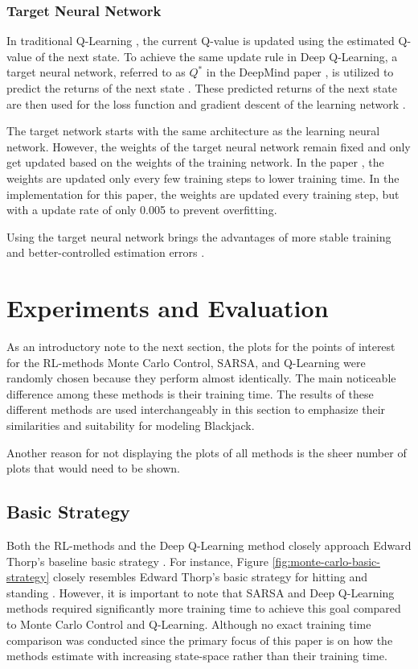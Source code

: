 \documentclass[conference]{IEEEtran}
\begin{document}
\subsubsection{Target Neural Network}
In traditional Q-Learning \cite{b4}, the current Q-value is updated using the estimated Q-value of the next state. To achieve the same update rule in Deep Q-Learning, a target neural network, referred to as $Q^*$ in the DeepMind paper \cite{b2}, is utilized to predict the returns of the next state \cite{b6}. These predicted returns of the next state are then used for the loss function and gradient descent of the learning network \cite{b6}.

The target network starts with the same architecture as the learning neural network. However, the weights of the target neural network remain fixed and only get updated based on the weights of the training network. In the paper \cite{b6}, the weights are updated only every few training steps to lower training time. In the implementation for this paper, the weights are updated every training step, but with a update rate of only 0.005 to prevent overfitting.

Using the target neural network brings the advantages of more stable training and better-controlled estimation errors \cite{b6}.


\section{Experiments and Evaluation}
As an introductory note to the next section, the plots for the points of interest for the RL-methods Monte Carlo Control, SARSA, and Q-Learning were randomly chosen because they perform almost identically. The main noticeable difference among these methods is their training time. The results of these different methods are used interchangeably in this section to emphasize their similarities and suitability for modeling Blackjack.

Another reason for not displaying the plots of all methods is the sheer number of plots that would need to be shown.


\subsection{Basic Strategy}
Both the RL-methods and the Deep Q-Learning method closely approach Edward Thorp's baseline basic strategy \cite{b1}. For instance, Figure \ref{fig:monte-carlo-basic-strategy} closely resembles Edward Thorp's basic strategy for hitting and standing \cite{b1}. However, it is important to note that SARSA and Deep Q-Learning methods required significantly more training time to achieve this goal compared to Monte Carlo Control and Q-Learning. Although no exact training time comparison was conducted since the primary focus of this paper is on how the methods estimate with increasing state-space rather than their training time.
\end{document}
